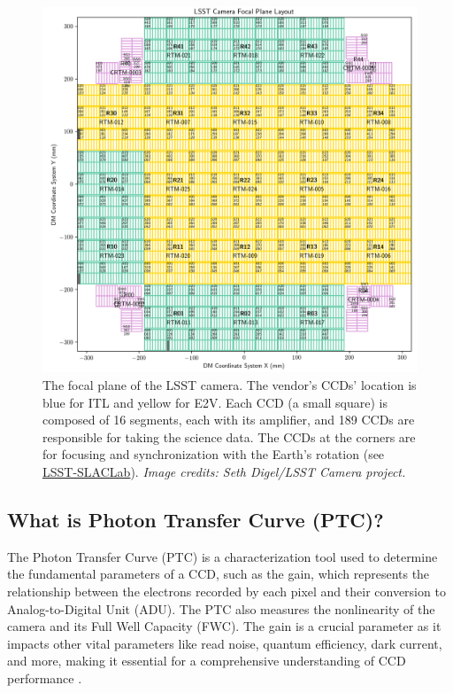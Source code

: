 \begin{figure}[!htb]
    \centering
    \includegraphics[width=\textwidth]{Figures/FP_layout_DM.png}
    \caption{The focal plane of the LSST camera. The vendor's CCDs' location is blue for ITL and yellow for E2V. Each CCD (a small square) is composed of 16 segments, each with its amplifier, and 189 CCDs are responsible for taking the science data. The CCDs at the corners are for focusing and synchronization with the Earth's rotation (see \href{https://www6.slac.stanford.edu/news/2020-09-08-sensors-world-largest-digital-camera-snap-first-3200-megapixel-images-slac.aspx}{LSST-SLACLab}). \textit{Image credits: Seth Digel/LSST Camera project.}}
    \label{fig:FP_LSSTCam}
\end{figure}

\subsection{What is Photon Transfer Curve (PTC)?}
The Photon Transfer Curve (PTC) is a characterization tool used to determine the fundamental parameters of a CCD, such as the gain, which represents the relationship between the electrons recorded by each pixel and their conversion to Analog-to-Digital Unit (ADU). The PTC also measures the nonlinearity of the camera and its Full Well Capacity (FWC). The gain is a crucial parameter as it impacts other vital parameters like read noise, quantum efficiency, dark current, and more, making it essential for a comprehensive understanding of CCD performance \citep{2006SPIE.6276E..09D}.

